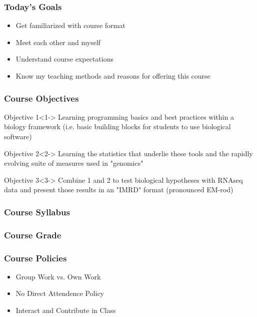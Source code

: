 \documentclass{beamer}
\begin{document}
\begin{frame}
\frametitle{Today's Goals}
\begin{itemize}
\item Get familiarized with course format
\item Meet each other and myself
\item Understand course expectations
\item Know my teaching methods and reasons for offering this course
\end{itemize}


\end{frame}
\begin{frame}
\frametitle{Course Objectives}
\begin{block}{Objective 1}<1->
Learning programming basics and best practices within a biology framework (i.e. basic building blocks for students to use biological software)
\end{block}

\begin{block}{Objective 2}<2->
Learning the statistics that underlie these tools and the rapidly evolving suite of measures used in "genomics"
\end{block}

\begin{block}{Objective 3}<3->
Combine 1 and 2 to test biological hypotheses with RNAseq data and present those results in an "IMRD" format (pronounced EM-rod)
\end{block}


\end{frame}
\begin{frame}
\frametitle{Course Syllabus}
\end{frame}
\begin{frame}
\frametitle{Course Grade}
\end{frame}
\begin{frame}
\frametitle{Course Policies}
\begin{itemize}
\item<1-> Group Work vs. Own Work
\item<2-> No Direct Attendence Policy
\item<3-> Interact and Contribute in Class
\end{itemize}


\end{frame}
\end{document}
